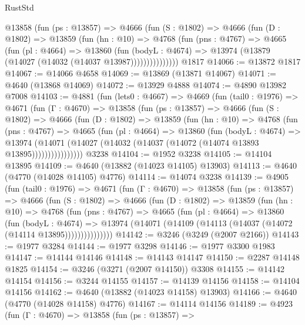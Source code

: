 \begin{lexlean}{RustStd}
\begin{coremodule}
          @13858
            (fun (ps : @13857) =>
            @4666
              (fun (S : @1802) =>
              @4666
                (fun (D : @1802) =>
                @13859
                  (fun (hn : @10) =>
                  @4768
                    (fun (pns : @4767) =>
                    @4665
                      (fun (pl : @4664) =>
                      @13860
                        (fun (bodyL : @4674) =>
                        @13974 (@13879 (@14027 (@14032 (@14037 @13987)))))))))))))))
    @1817
@14066 := @13872 @1817
@14067 := @14066 @4658
@14069 := @13869 (@13871 @14067)
@14071 := @4640 (@13868 @14069)
@14072 := @13929 @4888
@14074 := @4890 @13982 @7008
@14103 := @4881
    (fun (lets0 : @4667) =>
    @4669
      (fun (tail0 : @1976) =>
      @4671
        (fun (Γ : @4670) =>
        @13858
          (fun (ps : @13857) =>
          @4666
            (fun (S : @1802) =>
            @4666
              (fun (D : @1802) =>
              @13859
                (fun (hn : @10) =>
                @4768
                  (fun (pns : @4767) =>
                  @4665
                    (fun (pl : @4664) =>
                    @13860
                      (fun (bodyL : @4674) =>
                      @13974
                        (@14071
                          (@14027 (@14032 (@14037 (@14072 (@14074 @13893 @13895))))))))))))))))
    @3238
@14104 := @1952 @3238
@14105 := @14104 @13895
@14109 := @4640 (@13882 (@14023 @14105) @13903)
@14113 := @4640 (@4770 (@14028 @14105) @4776)
@14114 := @14074 @3238
@14139 := @4905
    (fun (tail0 : @1976) =>
    @4671
      (fun (Γ : @4670) =>
      @13858
        (fun (ps : @13857) =>
        @4666
          (fun (S : @1802) =>
          @4666
            (fun (D : @1802) =>
            @13859
              (fun (hn : @10) =>
              @4768
                (fun (pns : @4767) =>
                @4665
                  (fun (pl : @4664) =>
                  @13860
                    (fun (bodyL : @4674) =>
                    @13974 (@14071 (@14109 (@14113 (@14037 (@14072 (@14114 @13895)))))))))))))))
@14142 := @3246 (@3249 (@2007 @2166))
@14143 := @1977 @3284
@14144 := @1977 @3298
@14146 := @1977 @3300 @1983
@14147 := @14144 @14146
@14148 := @14143 @14147
@14150 := @2287 @14148 @1825
@14154 := @3246 (@3271 (@2007 @14150)) @3308
@14155 := @14142 @14154
@14156 := @3244 @14155
@14157 := @14139 @14156
@14158 := @14104 @14156
@14162 := @4640 (@13882 (@14023 @14158) @13903)
@14166 := @4640 (@4770 (@14028 @14158) @4776)
@14167 := @14114 @14156
@14189 := @4923
    (fun (Γ : @4670) =>
    @13858
      (fun (ps : @13857) =>

\end{coremodule}
\end{lexlean}
